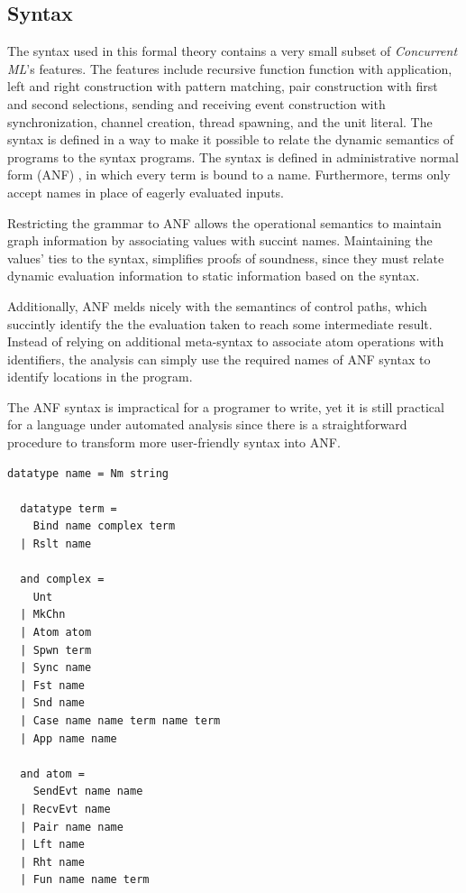 \documentclass[10pt]{article}
\begin{document}
\subsection{Syntax}
The syntax used in this formal theory contains a very small subset of
\textit{Concurrent ML}'s features. The features include recursive function function with
application, left and right construction with pattern matching, pair construction with first
and second selections, sending and receiving event construction with synchronization,
channel creation, thread spawning, and the unit literal. The syntax is defined in a way to
make it possible to relate the dynamic semantics of programs to the syntax programs.
The syntax is defined in administrative normal form (ANF) \cite{flanagan1993essence}, in which every term
is bound to a name. Furthermore, terms only accept names in place of eagerly evaluated
inputs. 

Restricting the grammar to ANF allows the operational semantics
to maintain graph information by associating values with succint names.
Maintaining the values' ties to the syntax,
simplifies proofs of soundness, since they must relate dynamic evaluation information
to static information based on the syntax.

Additionally, ANF melds nicely with the semantincs of control paths, which succintly identify
the the evaluation taken to reach some intermediate result.
Instead of relying on additional meta-syntax to associate atom operations with identifiers,
the analysis can simply use the required names of ANF syntax to identify locations in the program.

The ANF syntax is impractical for a programer to write,
yet it is still practical for a language under automated analysis
since there is a straightforward procedure to transform
more user-friendly syntax into ANF.

\begin{lstlisting}[language=logic]
  datatype name = Nm string

  datatype term = 
    Bind name complex term 
  | Rslt name

  and complex = 
    Unt
  | MkChn
  | Atom atom
  | Spwn term 
  | Sync name
  | Fst name
  | Snd name
  | Case name name term name term 
  | App name name

  and atom = 
    SendEvt name name
  | RecvEvt name
  | Pair name name
  | Lft name
  | Rht name
  | Fun name name term 
\end{lstlisting}
\end{document}
